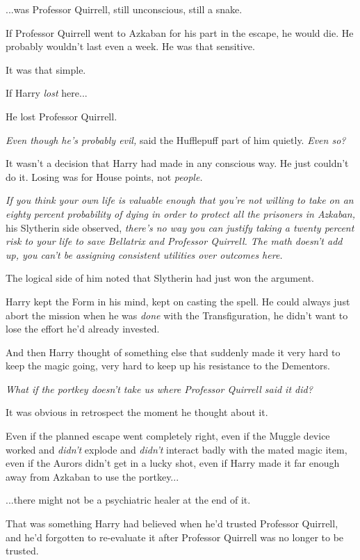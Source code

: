 ...was Professor Quirrell, still unconscious, still a snake.

If Professor Quirrell went to Azkaban for his part in the escape, he would die. He probably wouldn't last even a week. He was that sensitive.

It was that simple.

If Harry \emph{lost} here...

He lost Professor Quirrell.

\emph{Even though he's probably evil,} said the Hufflepuff part of him quietly. \emph{Even so?}

It wasn't a decision that Harry had made in any conscious way. He just couldn't do it. Losing was for House points, not \emph{people.}

\emph{If you think your own life is valuable enough that you're not willing to take on an eighty percent probability of dying in order to protect all the prisoners in Azkaban,} his Slytherin side observed, \emph{there's no way you can justify taking a twenty percent risk to your life to save Bellatrix and Professor Quirrell. The math doesn't add up, you can't be assigning consistent utilities over outcomes here.}

The logical side of him noted that Slytherin had just won the argument.

Harry kept the Form in his mind, kept on casting the spell. He could always just abort the mission when he was \emph{done} with the Transfiguration, he didn't want to lose the effort he'd already invested.

And then Harry thought of something else that suddenly made it very hard to keep the magic going, very hard to keep up his resistance to the Dementors.

\emph{What if the portkey doesn't take us where Professor Quirrell said it did?}

It was obvious in retrospect the moment he thought about it.

Even if the planned escape went completely right, even if the Muggle device worked and \emph{didn't} explode and \emph{didn't} interact badly with the mated magic item, even if the Aurors didn't get in a lucky shot, even if Harry made it far enough away from Azkaban to use the portkey...

...there might not be a psychiatric healer at the end of it.

That was something Harry had believed when he'd trusted Professor Quirrell, and he'd forgotten to re-evaluate it after Professor Quirrell was no longer to be trusted.

